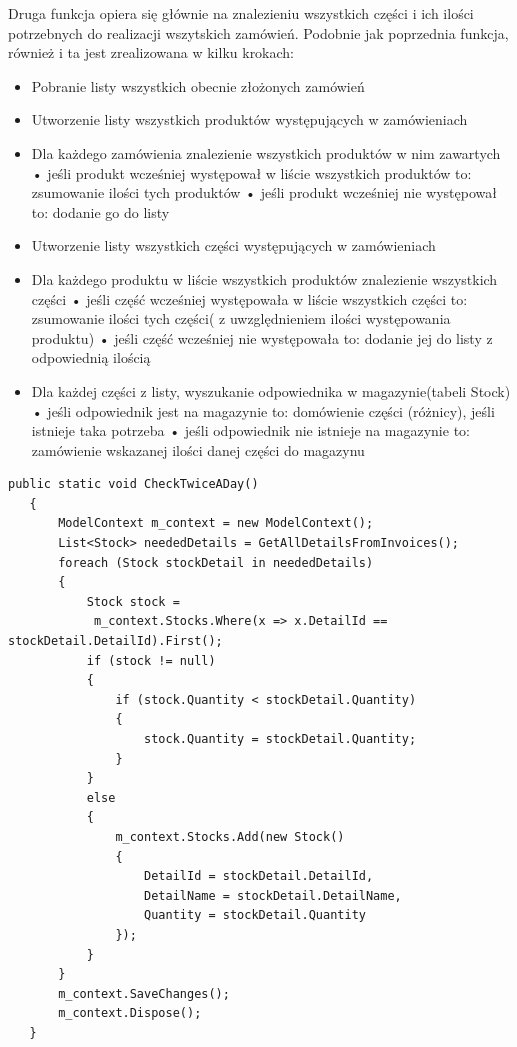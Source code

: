 \documentclass{article}
\begin{document}
Druga funkcja opiera się głównie na znalezieniu wszystkich części i ich ilości potrzebnych do
realizacji wszytskich zamówień. Podobnie jak poprzednia funkcja, również i ta jest zrealizowana w
kilku krokach:
\begin{itemize}
   \item Pobranie listy wszystkich obecnie złożonych zamówień
   \item Utworzenie listy wszystkich produktów występujących w zamówieniach
   \item Dla każdego zamówienia znalezienie wszystkich produktów w nim zawartych
         \subitem • jeśli produkt wcześniej występował w liście wszystkich produktów to: zsumowanie
         ilości tych produktów
         \subitem • jeśli produkt wcześniej nie występował to: dodanie go do listy
   \item Utworzenie listy wszystkich części występujących w zamówieniach
   \item Dla każdego produktu w liście wszystkich produktów znalezienie wszystkich części
         \subitem • jeśli część wcześniej występowała w liście wszystkich części to: zsumowanie
         ilości tych części( z uwzględnieniem ilości występowania produktu)
         \subitem • jeśli część wcześniej nie występowała to: dodanie jej do listy z odpowiednią ilością
   \item Dla każdej części z listy, wyszukanie odpowiednika w magazynie(tabeli Stock)
         \subitem • jeśli odpowiednik jest na magazynie to: domówienie części (różnicy), jeśli istnieje taka potrzeba
         \subitem • jeśli odpowiednik nie istnieje na magazynie to: zamówienie wskazanej ilości danej części do magazynu
\end{itemize}
\begin{lstlisting}[style=sharpc,caption={Funkcja sprawdzania magazynu wywoływana dwa razy dziennie},showstringspaces=false]
   public static void CheckTwiceADay()
   {
       ModelContext m_context = new ModelContext();
       List<Stock> neededDetails = GetAllDetailsFromInvoices();
       foreach (Stock stockDetail in neededDetails)
       {
           Stock stock = 
            m_context.Stocks.Where(x => x.DetailId == stockDetail.DetailId).First();
           if (stock != null)
           {
               if (stock.Quantity < stockDetail.Quantity)
               {
                   stock.Quantity = stockDetail.Quantity;
               }
           }
           else
           {
               m_context.Stocks.Add(new Stock()
               {
                   DetailId = stockDetail.DetailId,
                   DetailName = stockDetail.DetailName,
                   Quantity = stockDetail.Quantity
               });
           }
       }
       m_context.SaveChanges();
       m_context.Dispose();
   }
\end{lstlisting}
\end{document}
